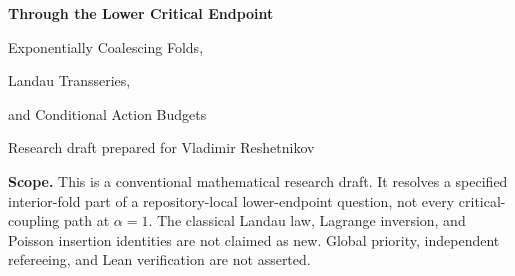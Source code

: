 \documentclass[11pt,a4paper]{article}
\numberwithin{equation}{section}
\theoremstyle{definition}
\theoremstyle{remark}
\DeclareMathOperator{\Li}{Li}
\newcommand{\ep}{\varepsilon}\newcommand{\la}{\lambda}
\begin{document}
\hypersetup{pageanchor=false}
\begin{titlepage}
\vspace*{8mm}
\vspace{17mm}
\begin{center}
{\LARGE\bfseries Through the Lower Critical Endpoint\par}
\vspace{7mm}
{\Large Exponentially Coalescing Folds,\par Landau Transseries,\par and Conditional Action Budgets\par}
\vspace{12mm}
{Research draft prepared for Vladimir Reshetnikov\par}
\vspace{3mm}{29 September 2026\par}
\end{center}
\vspace{10mm}
\begin{abstract}
We study the lower-endpoint problem for the countable-action equation
\(U=c\Li_{2+\ep}(q\ee^U)\), where \(\alpha=1+\ep\downarrow1\).
On the interior-fold side, an exact saddle normalization removes the
apparent pole at \(\ep=0\). It yields a uniform coefficient theorem with no
restriction on \(\ep\log(1/\delta)\), where \(\ee^{-\delta}\) is the fold
location. At the endpoint, \(\delta\sim\ee^{-1/c}\), and the crossover
variable is \(\la=nc\delta\). The limiting coefficient profile is an
explicit transform of the classical Landau density. We prove its
all-orders finite-coefficient correction scheme, a convergent Lambert
inverse chart and a uniform two-sheet fold chart. We also identify the
first obstruction to extending the compact-crossover formula into the
Gaussian range: a relative factor \(\exp(\la\delta/4)\).

For a truncation to actions \(j\le M\), we obtain the exact limiting
conditional profile and prove that coefficient preservation is equivalent
to \(M\delta\to\infty\) in a compact crossover window. Its loss has a sharp
doubly exponential equivalent, including the prefactor. Consequently the
scaled action budget for a small limiting loss \(h\) grows like
\(\la\log\log(1/h)\), not like \(\log(1/h)\). Proofs, exact algebraic checks,
numerical diagnostics, a source audit, and further research questions are
included.
\end{abstract}
\vfill
\noindent\textbf{Scope.} This is a conventional mathematical research draft.
It resolves a specified interior-fold part of a repository-local lower-endpoint
question, not every critical-coupling path at \(\alpha=1\). The classical
Landau law, Lagrange inversion, and Poisson insertion identities are not
claimed as new. Global priority, independent refereeing, and Lean verification
are not asserted.
\end{titlepage}
\hypersetup{pageanchor=true}\setcounter{page}{1}
\begingroup
\small
\setlength{\parskip}{0pt}
\tableofcontents
\endgroup
\clearpage
\end{document}
